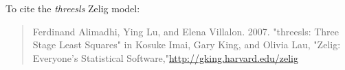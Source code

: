 To cite the \emph{ threesls } Zelig model:
 \begin{verse}
 Ferdinand Alimadhi, Ying Lu, and Elena Villalon. 2007. "threesls: Three Stage Least Squares" in Kosuke Imai, Gary King, and Olivia Lau, "Zelig: Everyone's Statistical Software,"\url{http://gking.harvard.edu/zelig} 
\end{verse}